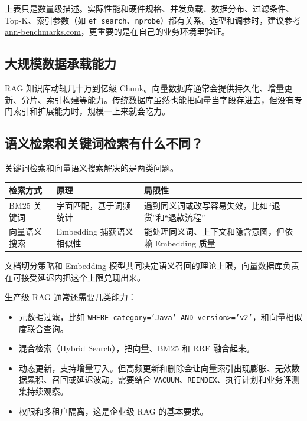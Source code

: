 \documentclass[9pt,a4paper,twocolumn]{ctexart}
\begin{document}
上表只是数量级描述。实际性能和硬件规格、并发负载、数据分布、过滤条件、Top-K、索引参数（如 \texttt{ef\_search}、\texttt{nprobe}）都有关系。选型和调参时，建议参考 \href{https://ann-benchmarks.com/}{ann-benchmarks.com}，更重要的是在自己的业务环境里验证。



\subsection*{大规模数据承载能力}


RAG 知识库动辄几十万到亿级 Chunk。向量数据库通常会提供持久化、增量更新、分片、索引构建等能力。传统数据库虽然也能把向量当字段存进去，但没有专门索引和扩展能力时，规模一上来就会吃力。



\subsection*{语义检索和关键词检索有什么不同？}


关键词检索和向量语义搜索解决的是两类问题。


{\footnotesize
\begin{tabular}{|p{}|p{}|p{}|}
\hline
\textbf{检索方式} & \textbf{原理} & \textbf{局限性} \\
\hline
BM25 关键词 & 字面匹配，基于词频统计 & 遇到同义词或改写容易失效，比如“退货”和“退款流程” \\
\hline
向量语义搜索 & Embedding 捕获语义相似性 & 能处理同义词、上下文和隐含意图，但依赖 Embedding 质量 \\
\hline
\end{tabular}
}



文档切分策略和 Embedding 模型共同决定语义召回的理论上限，向量数据库负责在可接受延迟内把这个上限兑现出来。



生产级 RAG 通常还需要几类能力：


\begin{itemize}[itemsep=1pt, topsep=2pt]
  \item 元数据过滤，比如 \texttt{WHERE category='Java' AND version>='v2'}，和向量相似度联合查询。
  \item 混合检索（Hybrid Search），把向量、BM25 和 RRF 融合起来。
  \item 动态更新，支持增量写入。但高频更新和删除会让向量索引出现膨胀、无效数据累积、召回或延迟波动，需要结合 \texttt{VACUUM}、\texttt{REINDEX}、执行计划和业务评测集持续观察。
  \item 权限和多租户隔离，这是企业级 RAG 的基本要求。
\end{itemize}
\end{document}
